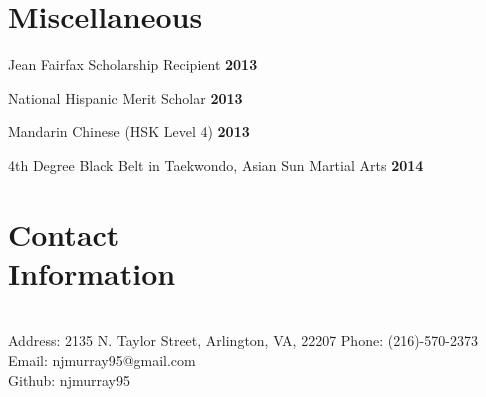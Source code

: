 \documentclass[margin,line]{resume}
\begin{document}
\begin{resume}


    \section{\mysidestyle Miscellaneous}
    \hfill

    \begin{list2}
    \item Jean Fairfax Scholarship Recipient \hfill \textbf{2013}
    \item National Hispanic Merit Scholar \hfill \textbf{2013}
    \item Mandarin Chinese (HSK Level 4) \hfill \textbf{2013}
    \item 4th Degree Black Belt in Taekwondo, Asian Sun Martial Arts \hfill \textbf{2014}
    \end{list2}

    \section{\mysidestyle Contact\\Information}
    \hfill \\

    Address: 2135 N. Taylor Street, Arlington, VA, 22207
    Phone: (216)-570-2373 \\
    Email: njmurray95@gmail.com \\
    Github: njmurray95

\end{resume}
\end{document}

